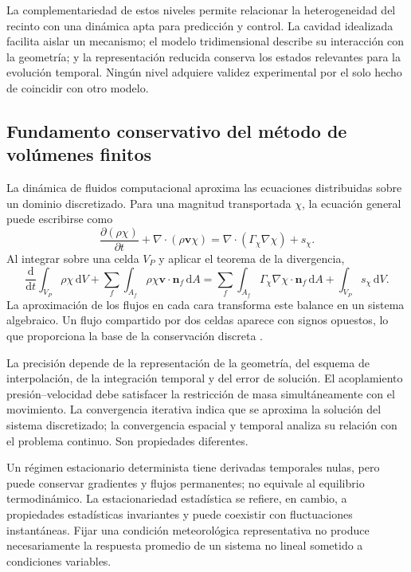 La complementariedad de estos niveles permite relacionar la heterogeneidad del recinto con una dinámica apta para predicción y control. La cavidad idealizada facilita aislar un mecanismo; el modelo tridimensional describe su interacción con la geometría; y la representación reducida conserva los estados relevantes para la evolución temporal. Ningún nivel adquiere validez experimental por el solo hecho de coincidir con otro modelo.

\subsection{Fundamento conservativo del método de volúmenes finitos}

La dinámica de fluidos computacional aproxima las ecuaciones distribuidas sobre un dominio discretizado. Para una magnitud transportada $\chi$, la ecuación general puede escribirse como
\begin{equation}
\frac{\partial(\rho\chi)}{\partial t}
+\nabla\cdot(\rho\mathbf v\chi)
=\nabla\cdot(\Gamma_\chi\nabla\chi)+s_\chi.
\label{eq:transporte_general_fvm}
\end{equation}
Al integrar sobre una celda $V_P$ y aplicar el teorema de la divergencia,
\begin{equation}
\frac{\mathrm{d}}{\mathrm{d}t}\int_{V_P}\rho\chi\,\mathrm{d}V
+\sum_f\int_{A_f}\rho\chi\mathbf v\cdot\mathbf n_f\,\mathrm{d}A
=\sum_f\int_{A_f}\Gamma_\chi\nabla\chi\cdot\mathbf n_f\,\mathrm{d}A
+\int_{V_P}s_\chi\,\mathrm{d}V.
\label{eq:balance_celda_fvm}
\end{equation}
La aproximación de los flujos en cada cara transforma este balance en un sistema algebraico. Un flujo compartido por dos celdas aparece con signos opuestos, lo que proporciona la base de la conservación discreta \cite{patankar1980,versteeg2007}.

La precisión depende de la representación de la geometría, del esquema de interpolación, de la integración temporal y del error de solución. El acoplamiento presión--velocidad debe satisfacer la restricción de masa simultáneamente con el movimiento. La convergencia iterativa indica que se aproxima la solución del sistema discretizado; la convergencia espacial y temporal analiza su relación con el problema continuo. Son propiedades diferentes.

Un régimen estacionario determinista tiene derivadas temporales nulas, pero puede conservar gradientes y flujos permanentes; no equivale al equilibrio termodinámico. La estacionariedad estadística se refiere, en cambio, a propiedades estadísticas invariantes y puede coexistir con fluctuaciones instantáneas. Fijar una condición meteorológica representativa no produce necesariamente la respuesta promedio de un sistema no lineal sometido a condiciones variables.

